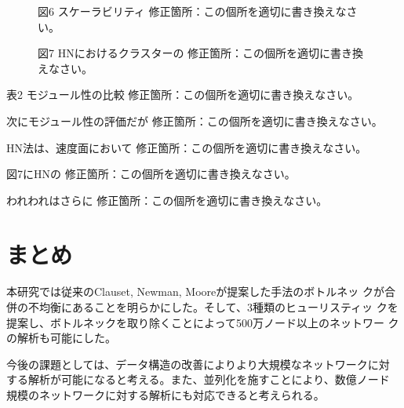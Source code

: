 \documentclass [a4j,11pt] {jsarticle}
\begin{document}
\begin{figure}[htbp]
\begin {空欄ブロック}{図6 スケーラビリティ}
修正箇所：この個所を適切に書き換えなさい。
\end {空欄ブロック}
\end{figure}

\begin{figure}[htbp]
\begin {空欄ブロック}{図7 HNにおけるクラスターの}
修正箇所：この個所を適切に書き換えなさい。
\end {空欄ブロック}
\end{figure}

\begin {table}
\begin {空欄ブロック}{表2 モジュール性の比較}
修正箇所：この個所を適切に書き換えなさい。
\end {空欄ブロック}
\end {table}

\begin {空欄ブロック}{次にモジュール性の評価だが}
修正箇所：この個所を適切に書き換えなさい。
\end {空欄ブロック}

\begin {空欄ブロック}{HN法は、速度面において}
修正箇所：この個所を適切に書き換えなさい。
\end {空欄ブロック}

\begin {空欄ブロック}{図7にHNの}
修正箇所：この個所を適切に書き換えなさい。
\end {空欄ブロック}

\begin {空欄ブロック}{われわれはさらに}
修正箇所：この個所を適切に書き換えなさい。
\end {空欄ブロック}


\section {まとめ}
\label {sect: summary}

本研究では従来のClauset, Newman, Mooreが提案した手法のボトルネッ
クが合併の不均衡にあることを明らかにした。そして、3種類のヒューリスティッ
クを提案し、ボトルネックを取り除くことによって500万ノード以上のネットワー
クの解析も可能にした。

今後の課題としては、データ構造の改善によりより大規模なネットワークに対
する解析が可能になると考える。また、並列化を施すことにより、数億ノード
規模のネットワークに対する解析にも対応できると考えられる。
\end{document}
